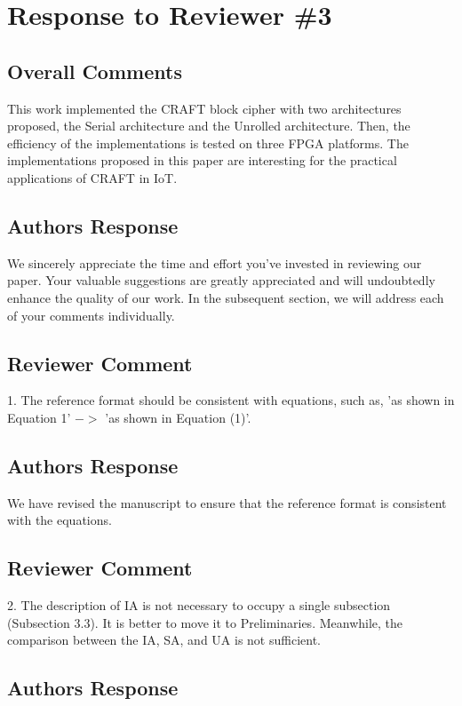 \section{Response to Reviewer \#3}
\subsection*{Overall Comments}
This work implemented the CRAFT block cipher with two architectures proposed, the Serial architecture and the Unrolled architecture. Then, the efficiency of the implementations is tested on three FPGA platforms. The implementations proposed in this paper are interesting for the practical applications of CRAFT in IoT.

\subsection{Authors Response}

We sincerely appreciate the time and effort you've invested in reviewing our paper. Your valuable suggestions are greatly appreciated and will undoubtedly enhance the quality of our work. In the subsequent section, we will address each of your comments individually.



\subsection{Reviewer Comment}
1. The reference format should be consistent with equations, such as, 'as shown in Equation 1' $->$ 'as shown in Equation (1)'.

\subsection{Authors Response}

We have revised the manuscript to ensure that the reference format is consistent with the equations.




\subsection{Reviewer Comment}
2. The description of IA is not necessary to occupy a single subsection (Subsection 3.3). It is better to move it to Preliminaries. Meanwhile, the comparison between the IA, SA, and UA is not sufficient.

\subsection{Authors Response}

